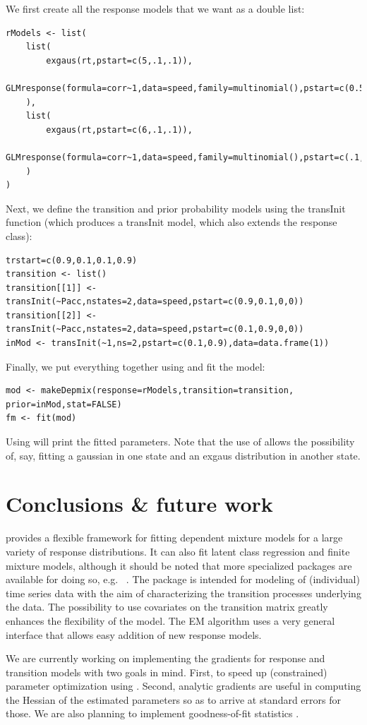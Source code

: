 \documentclass[article]{jss}
\begin{document}
We first create all the response models that we want as a double list: 
\begin{verbatim}
rModels <- list(
	list(
		exgaus(rt,pstart=c(5,.1,.1)),
		GLMresponse(formula=corr~1,data=speed,family=multinomial(),pstart=c(0.5,0.5))
	),
	list(
		exgaus(rt,pstart=c(6,.1,.1)),
		GLMresponse(formula=corr~1,data=speed,family=multinomial(),pstart=c(.1,.9))
	)
)
\end{verbatim}
Next, we define the transition and prior probability models using the 
transInit function (which produces a transInit model, which also extends 
the response class): 
\begin{verbatim}
trstart=c(0.9,0.1,0.1,0.9)
transition <- list()
transition[[1]] <- transInit(~Pacc,nstates=2,data=speed,pstart=c(0.9,0.1,0,0))
transition[[2]] <- transInit(~Pacc,nstates=2,data=speed,pstart=c(0.1,0.9,0,0))
inMod <- transInit(~1,ns=2,pstart=c(0.1,0.9),data=data.frame(1))
\end{verbatim}
Finally, we put everything together using  and fit 
the model: 
\begin{verbatim}
mod <- makeDepmix(response=rModels,transition=transition,
prior=inMod,stat=FALSE)
fm <- fit(mod)
\end{verbatim}

Using  will print the fitted parameters. Note that the 
use of  allows the possibility of, say, fitting a 
gaussian in one state and an exgaus distribution in another state. 


\section[Conclusions and future work]{Conclusions \& future work}

 provides a flexible framework for fitting dependent mixture models
for a large variety of response distributions. It can also fit latent class regression
and finite mixture models, although it should be noted that more specialized packages 
are available for doing so, e.g.\  \cite{Leisch2004}. The package is intended
for modeling of (individual) time series data with the aim of characterizing the transition 
processes underlying the data. The possibility to use covariates on the transition matrix
greatly enhances the flexibility of the model. The EM algorithm uses a very general 
interface that allows easy addition of new response models. 

We are currently working on implementing the gradients for response and transition models 
with two goals in mind. First, to speed up (constrained) parameter optimization using 
. Second, analytic gradients are useful in computing the Hessian of the
estimated parameters so as to arrive at standard errors for those. We are also planning to
implement goodness-of-fit statistics \citep{Titman2008}. 
\end{document}
